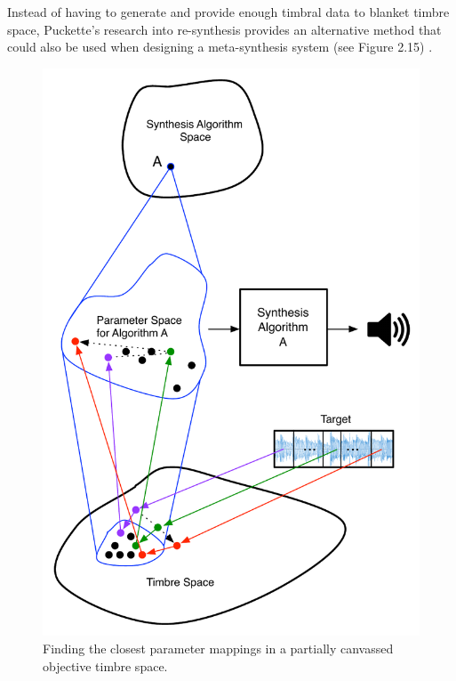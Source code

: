 \documentclass[12pt]{report} 	%
\numberwithin{figure}{chapter}
\numberwithin{table}{chapter}
\numberwithin{equation}{chapter}
\begin{document}
\begin{flushleft}
Instead of having to generate and provide enough timbral data to blanket timbre space, Puckette's research into re-synthesis provides an alternative method that could also be used when designing a meta-synthesis system (see Figure 2.15) \cite{Puckette:2004zp}.
\begin{figure}[h!]
\begin{center}
\includegraphics[scale=0.75]{PucketteMetaSynthesis}
\caption[Mapping timbre to parameters]{Finding the closest parameter mappings in a partially canvassed objective timbre space.}
\end{center}
\end{figure}


\end{flushleft}
\end{document}
